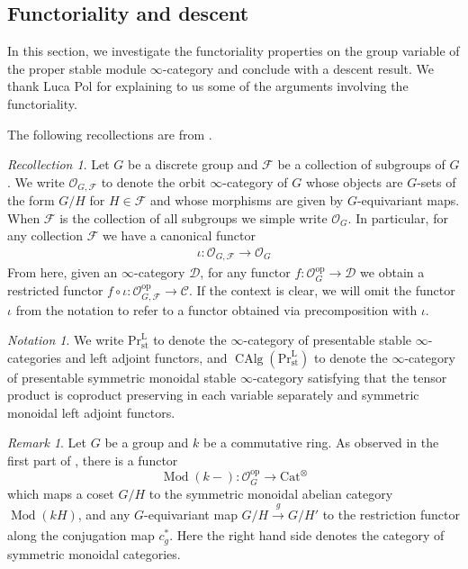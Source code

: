 \documentclass{amsart}
\newcommand{\nameop}{\operatorname{op}\nolimits}
\def \C{{\mathcal C}}
\def \D{{\mathcal D}}
\def \F{{\mathcal F}}
\def \O{{\mathcal O}}
\def \PrL{\mathrm{Pr}^{\mathrm{L}}_{\mathrm{st}}}
\DeclareMathOperator{\Mod}{Mod}
\DeclareMathOperator{\CAlg}{CAlg}
\numberwithin{equation}{section}%
\theoremstyle{remark}
\newtheorem{remark}[equation]{Remark}
\newtheorem{recollection}[equation]{Recollection}
\newtheorem{notation}[equation]{Notation}
\begin{document}
{\subsection{Functoriality and descent} \label{sec-functoriality}

In this section, we investigate the functoriality properties on the group variable of the proper stable module $\infty$-category and conclude with a descent result. We thank Luca Pol for explaining to us some of the arguments involving the functoriality.

The following recollections are from \cite{GP26}.

\begin{recollection}
    Let $G$ be a discrete group and $\F$ be a collection of subgroups of $G$. 
    We write $\O_{G,\F}$ to denote the orbit $\infty$-category of $G$ whose objects are $G$-sets of the form $G/H$ for $H\in \F$ and whose morphisms are given by $G$-equivariant maps. When $\F$ is the collection of all subgroups we simple write $\O_G$. In particular, for any collection $\F$ we have a canonical functor 
    \begin{align}
        \label{eq-iota}
        \iota \colon \O_{G,\F} \to \O_G
    \end{align}
    From here, given an $\infty$-category $\D$,  for any functor $f\colon \O_G^{\nameop}\to \D$ we obtain a restricted functor $f\circ \iota\colon \O_{G,\F}^{\nameop} \to \C$.  If the context is clear, we will omit the functor $\iota$ from the notation to refer to a functor obtained via precomposition with $\iota$.
\end{recollection}

\begin{notation}  
    We write $\PrL$ to denote the $\infty$-category of presentable stable $\infty$-categories and left adjoint functors, and $\CAlg(\PrL)$ to denote the $\infty$-category  of presentable symmetric monoidal stable $\infty$-category satisfying that the tensor product is coproduct preserving in each variable separately and symmetric monoidal left adjoint functors. 
\end{notation}


\begin{remark}\label{rem-functor-mod} 
    Let $G$ be a group and $k$ be a commutative ring.  As observed in the first part of  \cite[Construction 6.5]{GP26}, there is a functor 
    \[
    \Mod(k-)\colon \O_G^{\nameop} \to \mathrm{Cat}^\otimes 
    \]
    which maps a coset $G/H$ to the symmetric monoidal abelian category $\Mod(kH)$, and any $G$-equivariant map $G/H\xrightarrow[]{g} G/H' $ to the restriction functor along the conjugation map $c^\ast_g$. Here the right hand side denotes the category of symmetric monoidal categories. 
    

\end{remark}}
\end{document}
